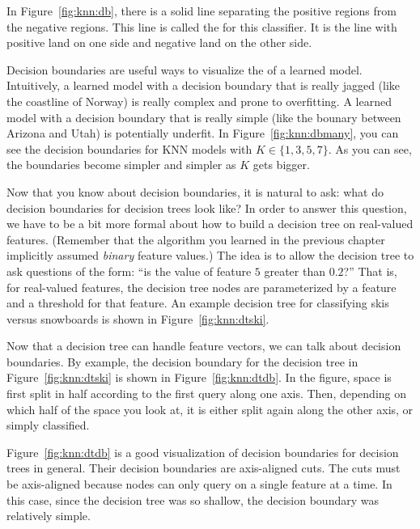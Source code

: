 In Figure~\ref{fig:knn:db}, there is a solid line separating the positive
regions from the negative regions.  This line is called the
 for this classifier.  It is the line with
positive land on one side and negative land on the other side.


Decision boundaries are useful ways to visualize the
 of a learned model.  Intuitively, a learned model
with a decision boundary that is really jagged (like the coastline of
Norway) is really complex and prone to overfitting.  A learned model
with a decision boundary that is really simple (like the bounary
between Arizona and Utah) is potentially underfit.  In
Figure~\ref{fig:knn:dbmany}, you can see the decision boundaries for KNN
models with $K \in \{1, 3, 5, 7\}$.  As you can see, the boundaries
become simpler and simpler as $K$ gets bigger.


Now that you know about decision boundaries, it is natural to ask:
what do decision boundaries for decision trees look like?  In order to
answer this question, we have to be a bit more formal about how to
build a decision tree on real-valued features.  (Remember that the
algorithm you learned in the previous chapter implicitly assumed
\emph{binary} feature values.)  The idea is to allow the decision tree
to ask questions of the form: ``is the value of feature $5$ greater
than $0.2$?''  That is, for real-valued features, the decision tree
nodes are parameterized by a feature and a threshold for that
feature.  An example decision tree for classifying skis versus
snowboards is shown in Figure~\ref{fig:knn:dtski}.


Now that a decision tree can handle feature vectors, we can talk about
decision boundaries.  By example, the decision boundary for the
decision tree in Figure~\ref{fig:knn:dtski} is shown in
Figure~\ref{fig:knn:dtdb}.  In the figure, space is first split in half
according to the first query along one axis.  Then, depending on which
half of the space you look at, it is either split again along the
other axis, or simply classified.


Figure~\ref{fig:knn:dtdb} is a good visualization of decision boundaries
for decision trees in general.  Their decision boundaries are
axis-aligned cuts.  The cuts must be axis-aligned because nodes can
only query on a single feature at a time.  In this case, since the
decision tree was so shallow, the decision boundary was relatively
simple.  

